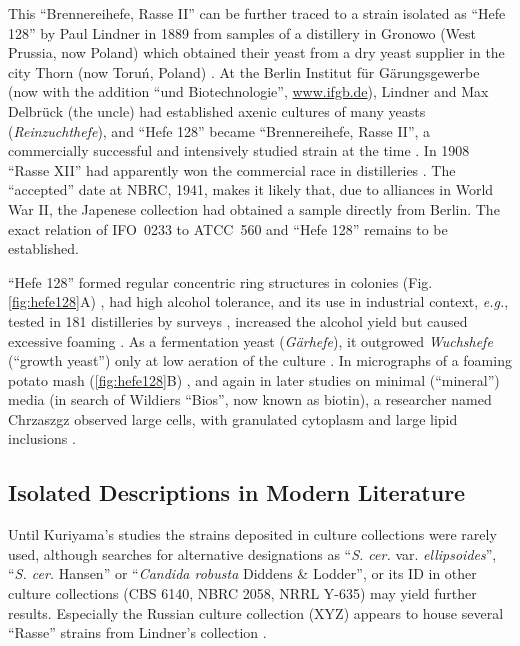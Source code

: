 \documentclass[11pt,a4paper,english]{article}
\newcommand{\ifo}{IFO~0233}
\newcommand{\eg}[0]{\textit{e.g.}}
\let\cite\citep
\begin{document}
This ``Brennereihefe, Rasse II'' can be further traced to a strain
isolated as ``Hefe 128'' by Paul Lindner in 1889 from samples of a
distillery in Gronowo (West Prussia, now Poland) which obtained their
yeast from a dry yeast supplier in the city Thorn (now Toru\'n,
Poland) \cite{Lindner1895}. At the Berlin Institut f\"ur
G\"arungsgewerbe (now with the addition ``und Biotechnologie'',
\url{www.ifgb.de}), Lindner and Max Delbr\"uck (the uncle) had
established axenic cultures of many yeasts (\textit{Reinzuchthefe}),
and ``Hefe 128'' became ``Brennereihefe, Rasse II'', a commercially
successful and intensively studied strain at the time
\cite{Lindner1895, Lindner1919}. In 1908 ``Rasse XII'' had apparently
won the commercial race in distilleries \cite{Kohl1908}.  The
``accepted'' date at NBRC, 1941, makes it likely that, due to
alliances in World War II, the Japenese collection had obtained a
sample directly from Berlin. The exact relation of \ifo{} to ATCC~560
and ``Hefe 128'' remains to be established.

``Hefe 128'' formed regular concentric ring structures in colonies
(Fig. \ref{fig:hefe128}A) \cite{Lindner1895}, had high alcohol tolerance, and
its use in industrial context, \eg{}, tested in 181 distilleries by
surveys \cite{Dingler1894}, increased the alcohol yield but caused
excessive foaming \cite{Behrend1900}. As a fermentation yeast
(\textit{G\"arhefe}), it outgrowed \textit{Wuchshefe} (``growth
yeast'') only at low aeration of the culture \cite{Haehn1952}.
%
In micrographs of a foaming potato mash (\ref{fig:hefe128}B)
\cite{Lindner1903}, and again in later studies on minimal (``mineral'')
media (in search of Wildiers ``Bios'', now known as biotin), a
researcher named Chrzaszgz observed large cells, with granulated
cytoplasm and large lipid inclusions \cite{Lindner1919}.
%
%
\subsection{Isolated Descriptions in Modern Literature}

Until Kuriyama's studies the strains deposited in culture collections
were rarely used, although searches for alternative designations as
``\textit{S. cer.} var. \textit{ellipsoides}'', ``\textit{S. cer.}
Hansen'' or ``\textit{Candida robusta} Diddens \& Lodder'', or its ID in
other culture collections (CBS 6140, NBRC 2058, NRRL Y-635) may yield
further results. Especially the Russian culture collection (XYZ)
appears to house several ``Rasse'' strains from Lindner's collection
\cite{Naumova2013}.
\end{document}
